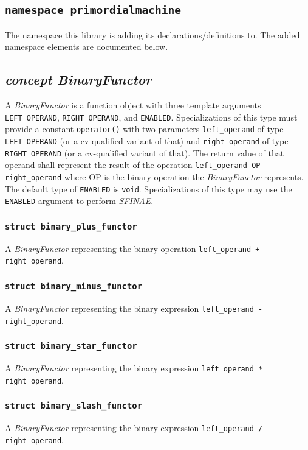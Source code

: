 \documentclass[oneside]{article}
\begin{document}
\subsection{\texttt{namespace primordialmachine}}
The namespace this library is adding its declarations/definitions to.
The added namespace elements are documented below.

\subsection{\textit{concept BinaryFunctor}}
A \textit{BinaryFunctor} is a function object with three template arguments \verb+LEFT_OPERAND+,
\verb+RIGHT_OPERAND+, and \verb+ENABLED+. Specializations of this type must provide a
constant \verb+operator()+ with two parameters \verb+left_operand+ of type \verb+LEFT_OPERAND+
(or a cv-qualified variant of that) and \verb+right_operand+ of type \verb+RIGHT_OPERAND+
(or a cv-qualified variant of that). The return value of that operand shall represent the
result of the operation \verb+left_operand OP right_operand+ where OP is the binary operation
the \textit{BinaryFunctor} represents.\\

\noindent{}The default type of \verb+ENABLED+ is \verb+void+. Specializations of this type may use
the \verb+ENABLED+ argument to perform \textit{SFINAE}.

\subsubsection{\texttt{struct binary\_plus\_functor}}
A \textit{BinaryFunctor} representing the binary operation \verb|left_operand + right_operand|.

\subsubsection{\texttt{struct binary\_minus\_functor}}
A \textit{BinaryFunctor} representing the binary expression \verb|left_operand - right_operand|.

\subsubsection{\texttt{struct binary\_star\_functor}}
A \textit{BinaryFunctor} representing the binary expression \verb|left_operand * right_operand|.

\subsubsection{\texttt{struct binary\_slash\_functor}}
A \textit{BinaryFunctor} representing the binary expression \verb|left_operand / right_operand|.
\end{document}
